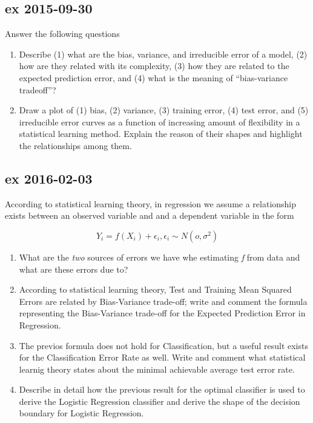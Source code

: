 \documentclass[a4paper,12pt,titlepage]{article} %
\begin{document}
\subsection{ex 2015-09-30}
Answer the following questions
\begin{enumerate}
\item Describe (1) what are the bias, variance, and irreducible error of a model, (2) how are they related with its complexity, (3) how they are related to the expected prediction error, and (4) what is the meaning of “bias-variance tradeoff”?
\item Draw a plot of (1) bias, (2) variance, (3) training error, (4) test error, and (5) irreducible error curves as a function of increasing amount of flexibility in a statistical learning method. Explain the reason of their shapes and highlight the relationships among them.
\end{enumerate}

\subsection{ex 2016-02-03}
According to statistical learning theory, in regression we assume a relationship exists between an observed variable and and a dependent variable in the form 

$$ Y_{i} = f(X_{i}) + \epsilon_{i}, \epsilon_{i} \sim N(o, \sigma^{2})$$

\begin{enumerate}
\item What are the \textit{two} sources of errors we have whe estimating \textit{f} from data and what are these errors due to?
\item According to statistical learning theory, Test and Training Mean Squared Errors are related by Bias-Variance trade-off; write and comment the formula representing the Bias-Variance trade-off for the Expected Prediction Error in Regression.
\item The previos formula does not hold for Classification, but a useful result exists for the Classification Error Rate as well. Write and comment what statistical learnig theory states about the minimal achievable average test error rate.
\item Describe in detail how the previous result for the optimal classifier is used to derive the Logistic Regression classifier and derive the shape of the decision boundary for Logistic Regression.
\end{enumerate}
\end{document}
